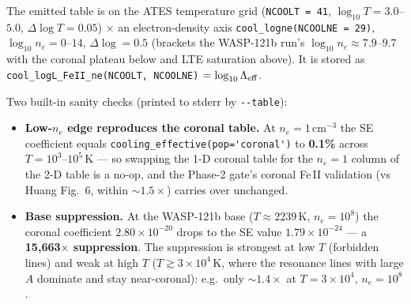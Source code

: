 \documentclass[english,a4paper]{kiseon_memo}
\begin{document}
The emitted table is on the ATES temperature grid (\verb|NCOOLT = 41|, \(\log_{10}T
= 3.0\)--\(5.0\), \(\Delta\log T = 0.05\)) \(\times\) an electron-density axis
\verb|cool_logne(NCOOLNE = 29)|, \(\log_{10}n_e = 0\)--\(14\), \(\Delta\log = 0.5\)
(brackets the WASP-121b run's \(\log_{10}n_e\approx7.9\)--\(9.7\) with the coronal
plateau below and LTE saturation above). It is stored as
\verb|cool_logL_FeII_ne(NCOOLT, NCOOLNE)| \(= \log_{10}\Lambda_{\rm eff}\).

Two built-in sanity checks (printed to stderr by \verb|--table|):
\begin{itemize}
  \item \textbf{Low-\(n_e\) edge reproduces the coronal table.} At \(n_e=1\)\,cm\(^{-3}\)
    the SE coefficient equals \verb|cooling_effective(pop='coronal')| to
    \textbf{0.1\%} across \(T = 10^3\)--\(10^5\)\,K --- so swapping the 1-D coronal
    table for the \(n_e=1\) column of the 2-D table is a no-op, and the Phase-2
    gate's coronal Fe\,II validation (vs Huang Fig.~6, within \(\sim1.5\times\))
    carries over unchanged.
  \item \textbf{Base suppression.} At the WASP-121b base (\(T\approx2239\)\,K,
    \(n_e=10^{8}\)) the coronal coefficient \(2.80\times10^{-20}\) drops to the SE
    value \(1.79\times10^{-24}\) --- a \textbf{15{,}663\(\times\) suppression}. The
    suppression is strongest at low \(T\) (forbidden lines) and weak at high \(T\)
    (\(T\gtrsim3\times10^4\)\,K, where the resonance lines with large \(A\) dominate
    and stay near-coronal): e.g.\ only \(\sim1.4\times\) at \(T=3\times10^4\),
    \(n_e=10^{8}\).
\end{itemize}
\end{document}
